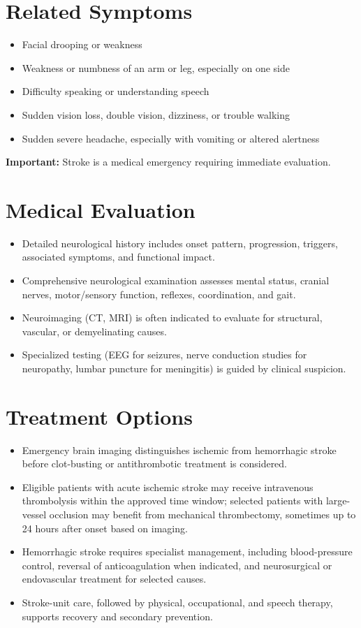 \section*{Related Symptoms}
\begin{itemize}
  \item Facial drooping or weakness
  \item Weakness or numbness of an arm or leg, especially on one side
  \item Difficulty speaking or understanding speech
  \item Sudden vision loss, double vision, dizziness, or trouble walking
  \item Sudden severe headache, especially with vomiting or altered alertness
\end{itemize}
\textbf{Important:} Stroke is a medical emergency requiring immediate evaluation.


\section*{Medical Evaluation}
\begin{itemize}
  \item Detailed neurological history includes onset pattern, progression, triggers, associated symptoms, and functional impact.
  \item Comprehensive neurological examination assesses mental status, cranial nerves, motor/sensory function, reflexes, coordination, and gait.
  \item Neuroimaging (CT, MRI) is often indicated to evaluate for structural, vascular, or demyelinating causes.
  \item Specialized testing (EEG for seizures, nerve conduction studies for neuropathy, lumbar puncture for meningitis) is guided by clinical suspicion.
\end{itemize}

\section*{Treatment Options}
\begin{itemize}
  \item Emergency brain imaging distinguishes ischemic from hemorrhagic stroke before clot-busting or antithrombotic treatment is considered.
  \item Eligible patients with acute ischemic stroke may receive intravenous thrombolysis within the approved time window; selected patients with large-vessel occlusion may benefit from mechanical thrombectomy, sometimes up to 24 hours after onset based on imaging.
  \item Hemorrhagic stroke requires specialist management, including blood-pressure control, reversal of anticoagulation when indicated, and neurosurgical or endovascular treatment for selected causes.
  \item Stroke-unit care, followed by physical, occupational, and speech therapy, supports recovery and secondary prevention.
\end{itemize}

